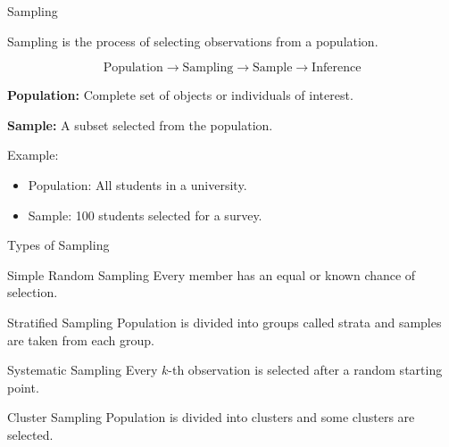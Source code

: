 \documentclass[aspectratio=169]{beamer}
\begin{document}
\begin{frame}{Sampling}

Sampling is the process of selecting observations from a population.

\begin{center}
\[
\boxed{\text{Population}}
\rightarrow
\boxed{\text{Sampling}}
\rightarrow
\boxed{\text{Sample}}
\rightarrow
\boxed{\text{Inference}}
\]
\end{center}

\textbf{Population:} Complete set of objects or individuals of interest.

\textbf{Sample:} A subset selected from the population.

Example:

\begin{itemize}
    \item Population: All students in a university.
    \item Sample: 100 students selected for a survey.
\end{itemize}
\end{frame}

\begin{frame}{Types of Sampling}

\begin{block}{Simple Random Sampling}
Every member has an equal or known chance of selection.
\end{block}

\begin{block}{Stratified Sampling}
Population is divided into groups called strata and samples
are taken from each group.
\end{block}

\begin{block}{Systematic Sampling}
Every $k$-th observation is selected after a random starting point.
\end{block}

\begin{block}{Cluster Sampling}
Population is divided into clusters and some clusters are selected.
\end{block}
\end{frame}
\end{document}
